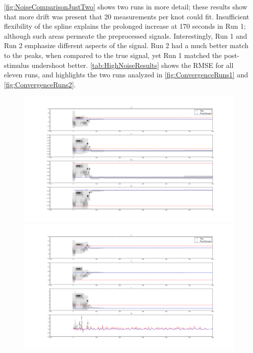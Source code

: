 \autoref{fig:NoiseComparisonJustTwo} shows two runs in more detail; these
results show that more drift was present that 20 measurements per knot 
could fit. Insufficient flexibility of the spline explains
the prolonged increase at 170 seconds in Run 1; although such areas
permeate the preprocessed signals.
Interestingly, Run 1 and Run 2 emphasize
different aspects of the signal. Run 2 had a much better match to the
peaks, when compared to the true signal, yet Run 1 matched the post-stimulus
undershoot better.  \autoref{tab:HighNoiseResults} shows
the \ac{RMSE} for all eleven runs, and highlights the two runs analyzed
in \autoref{fig:ConvergenceRuns1} and \autoref{fig:ConvergenceRuns2}.

\begin{figure}[H]
\subfigure
{\includegraphics[clip=true,trim=6cm 2cm 6cm 3cm, width=\textwidth]{images/highnoise_run5_1}}
\subfigure
{\includegraphics[clip=true,trim=6cm 2cm 6cm 3cm, width=\textwidth]{images/highnoise_run5_2}}
\end{figure}

